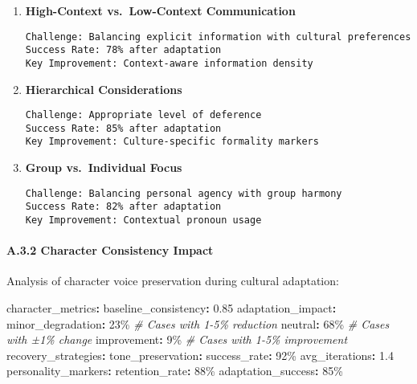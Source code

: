 \documentclass[
]{article}
\newenvironment{Shaded}{}{}
\newcommand{\AttributeTok}[1]{\textcolor[rgb]{0.49,0.56,0.16}{#1}}
\newcommand{\CommentTok}[1]{\textcolor[rgb]{0.38,0.63,0.69}{\textit{#1}}}
\newcommand{\FloatTok}[1]{\textcolor[rgb]{0.25,0.63,0.44}{#1}}
\newcommand{\FunctionTok}[1]{\textcolor[rgb]{0.02,0.16,0.49}{#1}}
\newcommand{\KeywordTok}[1]{\textcolor[rgb]{0.00,0.44,0.13}{\textbf{#1}}}
\begin{document}
\begin{enumerate}
\def\labelenumi{\arabic{enumi}.}
\item
  \textbf{High-Context vs.~Low-Context Communication}

\begin{verbatim}
Challenge: Balancing explicit information with cultural preferences
Success Rate: 78% after adaptation
Key Improvement: Context-aware information density
\end{verbatim}
\item
  \textbf{Hierarchical Considerations}

\begin{verbatim}
Challenge: Appropriate level of deference
Success Rate: 85% after adaptation
Key Improvement: Culture-specific formality markers
\end{verbatim}
\item
  \textbf{Group vs.~Individual Focus}

\begin{verbatim}
Challenge: Balancing personal agency with group harmony
Success Rate: 82% after adaptation
Key Improvement: Contextual pronoun usage
\end{verbatim}
\end{enumerate}

\paragraph{A.3.2 Character Consistency
Impact}\label{a.3.2-character-consistency-impact}

Analysis of character voice preservation during cultural adaptation:

\begin{Shaded}
\begin{Highlighting}[]
\FunctionTok{character\_metrics}\KeywordTok{:}
\AttributeTok{  }\FunctionTok{baseline\_consistency}\KeywordTok{:}\AttributeTok{ }\FloatTok{0.85}
\AttributeTok{  }\FunctionTok{adaptation\_impact}\KeywordTok{:}
\AttributeTok{    }\FunctionTok{minor\_degradation}\KeywordTok{:}\AttributeTok{ 23\%}\CommentTok{  \# Cases with 1{-}5\% reduction}
\AttributeTok{    }\FunctionTok{neutral}\KeywordTok{:}\AttributeTok{ 68\%}\CommentTok{            \# Cases with ±1\% change}
\AttributeTok{    }\FunctionTok{improvement}\KeywordTok{:}\AttributeTok{ 9\%}\CommentTok{         \# Cases with 1{-}5\% improvement}
\AttributeTok{  }
\AttributeTok{  }\FunctionTok{recovery\_strategies}\KeywordTok{:}
\AttributeTok{    }\FunctionTok{tone\_preservation}\KeywordTok{:}
\AttributeTok{      }\FunctionTok{success\_rate}\KeywordTok{:}\AttributeTok{ 92\%}
\AttributeTok{      }\FunctionTok{avg\_iterations}\KeywordTok{:}\AttributeTok{ }\FloatTok{1.4}
\AttributeTok{    }\FunctionTok{personality\_markers}\KeywordTok{:}
\AttributeTok{      }\FunctionTok{retention\_rate}\KeywordTok{:}\AttributeTok{ 88\%}
\AttributeTok{      }\FunctionTok{adaptation\_success}\KeywordTok{:}\AttributeTok{ 85\%}
\end{Highlighting}
\end{Shaded}
\end{document}
